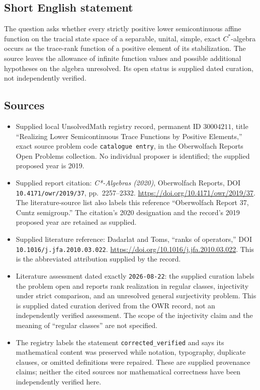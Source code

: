 \documentclass[11pt]{article}
\begin{document}
\subsection{Short English statement}
The question asks whether every strictly positive lower semicontinuous affine function on the tracial state space of a separable, unital, simple, exact \(C^*\)-algebra occurs as the trace-rank function of a positive element of its stabilization. The source leaves the allowance of infinite function values and possible additional hypotheses on the algebra unresolved. Its open status is supplied dated curation, not independently verified.
\subsection{Sources}
\begin{itemize}
\item Supplied local UnsolvedMath registry record, permanent ID \(30004211\), title ``Realizing Lower Semicontinuous Trace Functions by Positive Elements,'' exact source problem code \texttt{catalogue entry}, in the Oberwolfach Reports Open Problems collection. No individual proposer is identified; the supplied proposed year is 2019.
\item Supplied report citation: \emph{C*-Algebras (2020)}, Oberwolfach Reports, DOI \texttt{10.4171/owr/2019/37}, pp.\ 2257--2332. \url{https://doi.org/10.4171/owr/2019/37}. The literature-source list also labels this reference ``Oberwolfach Report 37, Cuntz semigroup.'' The citation's 2020 designation and the record's 2019 proposed year are retained as supplied.
\item Supplied literature reference: Dadarlat and Toms, ``ranks of operators,'' DOI \texttt{10.1016/j.jfa.2010.03.022}. \url{https://doi.org/10.1016/j.jfa.2010.03.022}. This is the abbreviated attribution supplied by the record.
\item Literature assessment dated exactly \texttt{2026-08-22}: the supplied curation labels the problem open and reports rank realization in regular classes, injectivity under strict comparison, and an unresolved general surjectivity problem. This is supplied dated curation derived from the OWR record, not an independently verified assessment. The scope of the injectivity claim and the meaning of ``regular classes'' are not specified.
\item The registry labels the statement \texttt{corrected\_verified} and says its mathematical content was preserved while notation, typography, duplicate clauses, or omitted definitions were repaired. These are supplied provenance claims; neither the cited sources nor mathematical correctness have been independently verified here.
\end{itemize}
\end{document}
